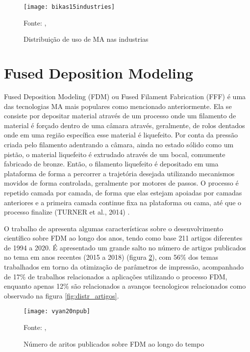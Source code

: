 \begin{figure}[!htb]
    \begin{center}
    \caption{Distribuição de uso de MA nas industrias}
    \texttt{[image: bikas15industries]}

    {\footnotesize Fonte: \citeauthor{bikas16}, \citeyear{bikas16}}
    \label{fig:MA_industrias}
    \end{center}
\end{figure}

\section{Fused Deposition Modeling}
Fused Deposition Modeling (FDM) ou Fused Filament Fabrication 
(FFF) é uma das tecnologias MA mais populares como mencionado anteriormente.
Ela se consiste por depositar material através de um processo 
onde um filamento de material é forçado dentro de uma câmara através,
geralmente, de rolos dentados onde em uma região específica esse 
material é liquefeito. Por conta da pressão criada pelo filamento 
adentrando a câmara, ainda no estado sólido como um pistão, 
o material liquefeito é extrudado através de um bocal, 
comumente fabricado de bronze. Então, o filamento liquefeito é 
depositado em uma plataforma de forma a percorrer a trajetória 
desejada utilizando mecanismos movidos de forma controlada, 
geralmente por motores de passos. O processo é repetido camada 
por camada, de forma que elas estejam apoiadas por camadas 
anteriores e a primeira camada continue fixa na plataforma ou 
cama, até que o processo finalize (TURNER et al., 2014) \cite{turner14}.

O trabalho de \cite{vyavahare20} apresenta algumas 
características sobre o desenvolvimento científico sobre 
FDM ao longo dos anos, tendo como base 211 artigos diferentes 
de 1994 a 2020. É apresentado um grande salto no número de 
artigos publicados no tema em anos recentes (2015 a 2018) 
(figura \ref{fig:numero_artigos}), com 56\% dos temas trabalhados em torno da 
otimização de parâmetros de impressão, acompanhado de 17\% de 
trabalhos relacionados a aplicações utilizando o processo FDM, enquanto apenas 12\%
são relacionados a avanços tecnologicos relacionados como observado na figura \ref{fig:distr_artigos}.


\begin{figure}[!htb]
    \centering
    \caption{Número de aritos publicados sobre FDM ao longo do tempo}
    \texttt{[image: vyan20npub]}
    
    {\footnotesize Fonte: \citeauthor{vyavahare20}, \citeyear{vyavahare20}}
    \label{fig:numero_artigos}
\end{figure}

